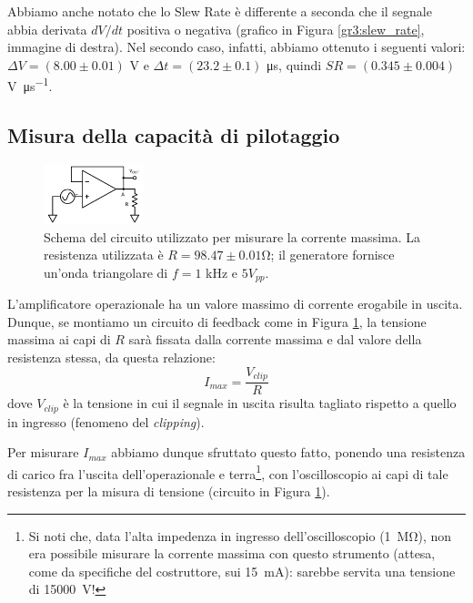 Abbiamo anche notato che lo Slew Rate è differente a seconda che il segnale abbia derivata $dV/dt$ positiva o negativa (grafico in Figura \ref{gr3:slew_rate}, immagine di destra). Nel secondo caso, infatti, abbiamo ottenuto i seguenti valori: $\Delta V = (8.00 \pm 0.01)$ \si{\volt} e $\Delta t = (23.2 \pm 0.1)$ \si{\micro\second}, quindi $SR = (0.345 \pm 0.004)$ \si{\volt\per\micro\second}.

\subsection{Misura della capacità di pilotaggio}

\begin{figure}
  \begin{center}
    \includegraphics[width=0.26\textwidth]{../E03/latex/max_current.pdf}
  \end{center}
  \caption{Schema del circuito utilizzato per misurare la corrente massima. La resistenza utilizzata è $R=98.47\pm0.01$\si{\ohm}; il generatore fornisce un'onda triangolare di $f=1$ \si{\kilo\hertz} e $5 V_{pp}$.}
  \label{cir3:max_current}
\end{figure}

L'amplificatore operazionale ha un valore massimo di corrente erogabile in uscita. Dunque, se montiamo un circuito di feedback come in Figura \ref{cir3:max_current}, la tensione massima ai capi di $R$ sarà fissata dalla corrente massima e dal valore della resistenza stessa, da questa relazione:
\begin{equation*}
	I_{max} = \frac{V_{clip}}{R}
\end{equation*}
dove $V_{clip}$ è la tensione in cui il segnale in uscita risulta tagliato rispetto a quello in ingresso (fenomeno del \textit{clipping}).

Per misurare $I_{max}$ abbiamo dunque sfruttato questo fatto, ponendo una resistenza di carico fra l'uscita dell'operazionale e terra\footnote{Si noti che, data l'alta impedenza in ingresso dell'oscilloscopio (\SI{1}{\mega\ohm}), non era possibile misurare la corrente massima con questo strumento (attesa, come da specifiche del costruttore, sui \SI{15}{\milli\ampere}): sarebbe servita una tensione di \SI{15000}{\volt}!}, con l'oscilloscopio ai capi di tale resistenza per la misura di tensione (circuito in Figura \ref{cir3:max_current}).


